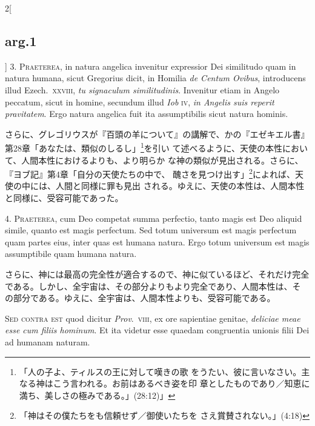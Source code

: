 \documentclass[paper=a4paper,fontsize=10pt,jafontsize=9pt,titlepage]{jlreq}
\begin{document}
\begin{paracol}{2}[\subsection{arg.1}]
3. {\scshape Praeterea}, in natura angelica invenitur expressior Dei similitudo quam
in natura humana, sicut Gregorius dicit, in Homilia {\itshape de Centum Ovibus},
introducens illud Ezech.~{\scshape xxviii}, {\itshape tu signaculum similitudinis}. Invenitur
etiam in Angelo peccatum, sicut in homine, secundum illud {\itshape Iob}
 {\scshape iv}, {\itshape in
Angelis suis reperit pravitatem}. Ergo natura angelica fuit ita
assumptibilis sicut natura hominis.

\switchcolumn

さらに、グレゴリウスが『百頭の羊について』の講解で、かの『エゼキエル書』
 第28章「あなたは、類似のしるし」\footnote{「人の子よ、ティルスの王に対して嘆きの歌
 をうたい、彼に言いなさい。主なる神はこう言われる。お前はあるべき姿を印
 章としたものであり／知恵に満ち、美しさの極みである。」(28:12)」}を引い
 て述べるように、天使の本性において、人間本性におけるよりも、より明らか
 な神の類似が見出される。さらに、『ヨブ記』第4章「自分の天使たちの中で、
 醜さを見つけ出す」\footnote{「神はその僕たちをも信頼せず／御使いたちを
 さえ賞賛されない。」(4:18)}によれば、天使の中には、人間と同様に罪も見出
 される。ゆえに、天使の本性は、人間本性と同様に、受容可能であった。


4. {\scshape Praeterea}, cum Deo competat summa perfectio, tanto magis est Deo aliquid
simile, quanto est magis perfectum. Sed totum universum est magis
perfectum quam partes eius, inter quas est humana natura. Ergo totum
universum est magis assumptibile quam humana natura.

\switchcolumn

さらに、神には最高の完全性が適合するので、神に似ているほど、それだけ完全
 である。しかし、全宇宙は、その部分よりもより完全であり、人間本性は、そ
 の部分である。ゆえに、全宇宙は、人間本性よりも、受容可能である。

\switchcolumn*[\subsection{s.c.}]

{\scshape Sed contra est} quod dicitur {\itshape Prov}.~{\scshape viii}, ex ore sapientiae genitae,
{\itshape deliciae meae esse cum filiis hominum}. Et ita videtur esse quaedam
congruentia unionis filii Dei ad humanam naturam.


\end{paracol}
\end{document}
